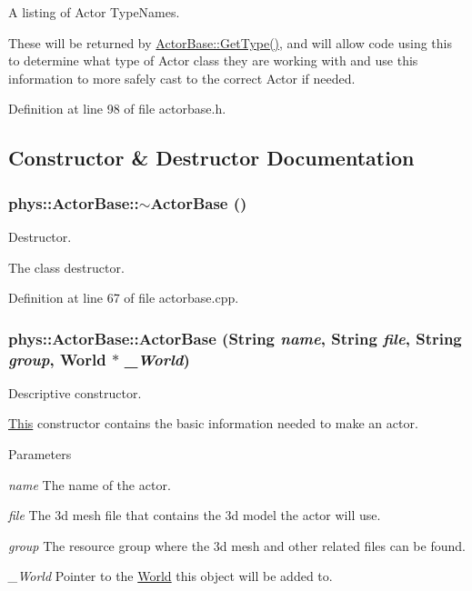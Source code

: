 A listing of Actor TypeNames. 

These will be returned by \hyperlink{classphys_1_1ActorBase_ab8bedea2ef0ce9194731ebeb886333ff}{ActorBase::GetType()}, and will allow code using this to determine what type of Actor class they are working with and use this information to more safely cast to the correct Actor if needed. 

Definition at line 98 of file actorbase.h.



\subsection{Constructor \& Destructor Documentation}
\hypertarget{classphys_1_1ActorBase_a5e5d4b50c83c6851e554b5e7ad65403f}{
\subsubsection[{$\sim$ActorBase}]{\setlength{\rightskip}{0pt plus 5cm}phys::ActorBase::$\sim$ActorBase ()}}
\label{d8/d0f/classphys_1_1ActorBase_a5e5d4b50c83c6851e554b5e7ad65403f}


Destructor. 

The class destructor. 

Definition at line 67 of file actorbase.cpp.

\hypertarget{classphys_1_1ActorBase_ad9d90a68921ce81653e9950c1330809d}{
\subsubsection[{ActorBase}]{\setlength{\rightskip}{0pt plus 5cm}phys::ActorBase::ActorBase ({\bf String} {\em name}, \/  {\bf String} {\em file}, \/  {\bf String} {\em group}, \/  {\bf World} $\ast$ {\em \_\-World})}}
\label{d8/d0f/classphys_1_1ActorBase_ad9d90a68921ce81653e9950c1330809d}


Descriptive constructor. 

\hyperlink{structThis}{This} constructor contains the basic information needed to make an actor. 
\begin{DoxyParams}{Parameters}
\item[{\em name}]The name of the actor. \item[{\em file}]The 3d mesh file that contains the 3d model the actor will use. \item[{\em group}]The resource group where the 3d mesh and other related files can be found. \item[{\em \_\-World}]Pointer to the \hyperlink{classphys_1_1World}{World} this object will be added to. \end{DoxyParams}


